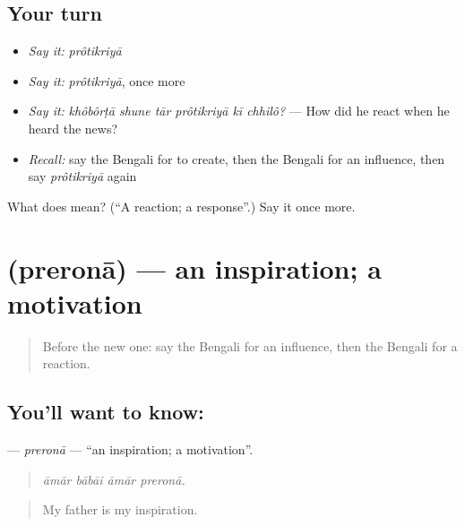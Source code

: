 \subsection*{Your turn}
\begin{itemize}
\raggedright
  \item \emph{Say it:} \emph{prôtikriyā}
  \item \emph{Say it:} \emph{prôtikriyā}, once more
  \item \emph{Say it:} \emph{khôbôrṭā shune tār prôtikriyā kī chhilô?} — How did he react when he heard the news?
  \item \emph{Recall:} say the Bengali for to create, then the Bengali for an influence, then say \emph{prôtikriyā} again
\end{itemize}

\begin{tcolorbox}[breakable,colback=teal!4,colframe=teal!35!black,title={Before you move on}]
What does  mean? (\textquotedblleft{}A reaction; a response\textquotedblright{}.) Say it once more.
\end{tcolorbox}
\section[\texorpdfstring{\bn{প্রেরণা} (preronā)}{প্রেরণা (preronā)}]{ (preronā) — an inspiration; a motivation}

\label{lesson:BN-C330-prerona}



\begin{quote}
Before the new one: say the Bengali for an influence, then the Bengali for a reaction.
\end{quote}

\subsection*{You'll want to know: }
\textbf{} — \emph{preronā} — \textquotedblleft{}an inspiration; a motivation\textquotedblright{}.

\begin{quote}
   
\end{quote}

\begin{quote}
\emph{āmār bābāi āmār preronā.}
\end{quote}

\begin{quote}
My father is my inspiration.
\end{quote}

